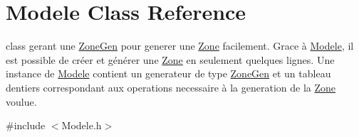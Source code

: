 \hypertarget{classModele}{}\section{Modele Class Reference}
\label{classModele}


class gerant une \hyperlink{classZoneGen}{Zone\+Gen} pour generer une \hyperlink{classZone}{Zone} facilement. Grace à \hyperlink{classModele}{Modele}, il est possible de créer et générer une \hyperlink{classZone}{Zone} en seulement quelques lignes. Une instance de \hyperlink{classModele}{Modele} contient un generateur de type \hyperlink{classZoneGen}{Zone\+Gen} et un tableau d\textquotesingle{}entiers correspondant aux operations necessaire à la generation de la \hyperlink{classZone}{Zone} voulue.  




{\ttfamily \#include $<$Modele.\+h$>$}

